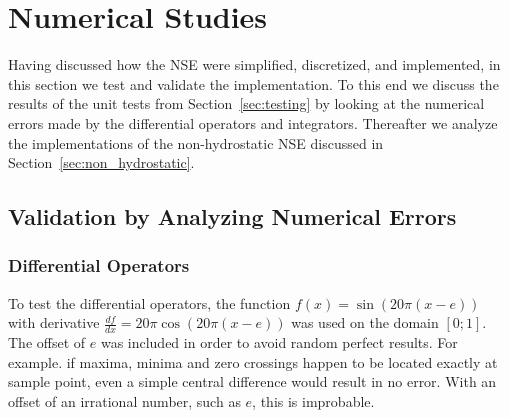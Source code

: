 \chapter{Numerical Studies}\label{chapter:numerical_study}
Having discussed how the NSE were simplified, discretized, and implemented, in this section we test and validate the implementation.
To this end we discuss the results of the unit tests from Section~\ref{sec:testing} by looking at the numerical errors made by the differential operators and integrators.
Thereafter we analyze the implementations of the non-hydrostatic NSE discussed in Section~\ref{sec:non_hydrostatic}.

\section{Validation by Analyzing Numerical Errors}

\subsection{Differential Operators}\label{sec:numeric_diff_ops}
To test the differential operators, the function $f(x)=\sin(20\pi (x-e))$ with derivative $\frac{df}{dx}=20\pi\cos(20\pi (x-e))$ was used on the domain $[0;1]$.
The offset of $e$ was included in order to avoid random perfect results.
For example. if maxima, minima and zero crossings happen to be located exactly at sample point, even a simple central difference would result in no error.
With an offset of an irrational number, such as $e$, this is improbable.

